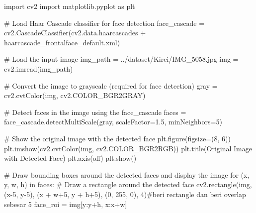 \documentclass[
  letterpaper,
  DIV=11,
  numbers=noendperiod]{scrreprt}
\newenvironment{Shaded}{\begin{snugshade}}{\end{snugshade}}
\newcommand{\CommentTok}[1]{\textcolor[rgb]{0.37,0.37,0.37}{#1}}
\newcommand{\ControlFlowTok}[1]{\textcolor[rgb]{0.00,0.23,0.31}{#1}}
\newcommand{\DecValTok}[1]{\textcolor[rgb]{0.68,0.00,0.00}{#1}}
\newcommand{\FloatTok}[1]{\textcolor[rgb]{0.68,0.00,0.00}{#1}}
\newcommand{\ImportTok}[1]{\textcolor[rgb]{0.00,0.46,0.62}{#1}}
\newcommand{\KeywordTok}[1]{\textcolor[rgb]{0.00,0.23,0.31}{#1}}
\newcommand{\NormalTok}[1]{\textcolor[rgb]{0.00,0.23,0.31}{#1}}
\newcommand{\OperatorTok}[1]{\textcolor[rgb]{0.37,0.37,0.37}{#1}}
\newcommand{\StringTok}[1]{\textcolor[rgb]{0.13,0.47,0.30}{#1}}
\begin{document}
\begin{Shaded}
\begin{Highlighting}[]
\ImportTok{import}\NormalTok{ cv2}
\ImportTok{import}\NormalTok{ matplotlib.pyplot }\ImportTok{as}\NormalTok{ plt}

\CommentTok{\# Load Haar Cascade classifier for face detection}
\NormalTok{face\_cascade }\OperatorTok{=}\NormalTok{ cv2.CascadeClassifier(cv2.data.haarcascades }\OperatorTok{+} \StringTok{\textquotesingle{}haarcascade\_frontalface\_default.xml\textquotesingle{}}\NormalTok{)}

\CommentTok{\# Load the input image}
\NormalTok{img\_path }\OperatorTok{=} \StringTok{\textquotesingle{}../dataset/Kirei/IMG\_5058.jpg\textquotesingle{}}
\NormalTok{img }\OperatorTok{=}\NormalTok{ cv2.imread(img\_path)}

\CommentTok{\# Convert the image to grayscale (required for face detection)}
\NormalTok{gray }\OperatorTok{=}\NormalTok{ cv2.cvtColor(img, cv2.COLOR\_BGR2GRAY)}

\CommentTok{\# Detect faces in the image using the face\_cascade}
\NormalTok{faces }\OperatorTok{=}\NormalTok{ face\_cascade.detectMultiScale(gray, scaleFactor}\OperatorTok{=}\FloatTok{1.5}\NormalTok{, minNeighbors}\OperatorTok{=}\DecValTok{5}\NormalTok{)}

\CommentTok{\# Show the original image with the detected face}
\NormalTok{plt.figure(figsize}\OperatorTok{=}\NormalTok{(}\DecValTok{8}\NormalTok{, }\DecValTok{6}\NormalTok{))}
\NormalTok{plt.imshow(cv2.cvtColor(img, cv2.COLOR\_BGR2RGB))}
\NormalTok{plt.title(}\StringTok{\textquotesingle{}Original Image with Detected Face\textquotesingle{}}\NormalTok{)}
\NormalTok{plt.axis(}\StringTok{\textquotesingle{}off\textquotesingle{}}\NormalTok{)}
\NormalTok{plt.show()}


\CommentTok{\# Draw bounding boxes around the detected faces and display the image}
\ControlFlowTok{for}\NormalTok{ (x, y, w, h) }\KeywordTok{in}\NormalTok{ faces:}
    \CommentTok{\# Draw a rectangle around the detected face}
\NormalTok{    cv2.rectangle(img, (x}\OperatorTok{{-}}\DecValTok{5}\NormalTok{, y}\OperatorTok{{-}}\DecValTok{5}\NormalTok{), (x }\OperatorTok{+}\NormalTok{ w}\OperatorTok{+}\DecValTok{5}\NormalTok{, y }\OperatorTok{+}\NormalTok{ h}\OperatorTok{+}\DecValTok{5}\NormalTok{), (}\DecValTok{0}\NormalTok{, }\DecValTok{255}\NormalTok{, }\DecValTok{0}\NormalTok{), }\DecValTok{4}\NormalTok{)}\CommentTok{\#beri rectangle dan beri overlap sebesar 5}
\NormalTok{    face\_roi }\OperatorTok{=}\NormalTok{ img[y:y}\OperatorTok{+}\NormalTok{h, x:x}\OperatorTok{+}\NormalTok{w]}


\end{Highlighting}
\end{Shaded}
\end{document}
